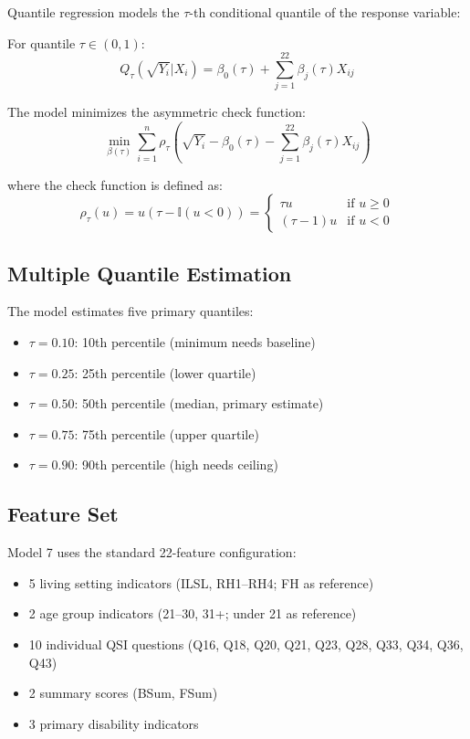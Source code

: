 Quantile regression models the $\tau$-th conditional quantile of the response variable:

For quantile $\tau \in (0,1)$:
\begin{equation}
Q_{\tau}(\sqrt{Y_i} | X_i) = \beta_0(\tau) + \sum_{j=1}^{22} \beta_j(\tau) X_{ij}
\end{equation}

The model minimizes the asymmetric check function:
\begin{equation}
\min_{\beta(\tau)} \sum_{i=1}^n \rho_\tau\left(\sqrt{Y_i} - \beta_0(\tau) - \sum_{j=1}^{22} \beta_j(\tau) X_{ij}\right)
\end{equation}

where the check function is defined as:
\begin{equation}
\rho_\tau(u) = u(\tau - \mathbb{I}(u < 0)) = \begin{cases}
\tau u & \text{if } u \geq 0 \\
(\tau - 1) u & \text{if } u < 0
\end{cases}
\end{equation}

\subsection{Multiple Quantile Estimation}

The model estimates five primary quantiles:
\begin{itemize}
    \item $\tau = 0.10$: 10th percentile (minimum needs baseline)
    \item $\tau = 0.25$: 25th percentile (lower quartile)
    \item $\tau = 0.50$: 50th percentile (median, primary estimate)
    \item $\tau = 0.75$: 75th percentile (upper quartile)
    \item $\tau = 0.90$: 90th percentile (high needs ceiling)
\end{itemize}

\subsection{Feature Set}

Model 7 uses the standard 22-feature configuration:
\begin{itemize}
    \item 5 living setting indicators (ILSL, RH1--RH4; FH as reference)
    \item 2 age group indicators (21--30, 31+; under 21 as reference)
    \item 10 individual QSI questions (Q16, Q18, Q20, Q21, Q23, Q28, Q33, Q34, Q36, Q43)
    \item 2 summary scores (BSum, FSum)
    \item 3 primary disability indicators
\end{itemize}

